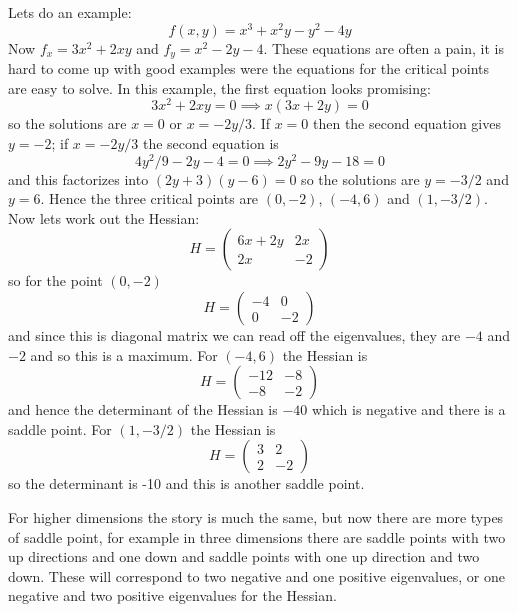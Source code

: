 \documentclass[12pt]{article}
\begin{document}
Lets do an example:
\begin{equation}
  f(x,y)=x^3+x^2y-y^2-4y
\end{equation}
Now $f_x=3x^2+2xy$ and $f_y=x^2-2y-4$. These equations are often a
pain, it is hard to come up with good examples were the equations for
the critical points are easy to solve. In this example, the first equation looks promising:
\begin{equation}
  3x^2+2xy=0\implies{}x(3x+2y)=0
\end{equation}
so the solutions are $x=0$ or $x=-2y/3$. If $x=0$ then the second
equation gives $y=-2$; if $x=-2y/3$ the second equation is
\begin{equation}
  4y^2/9-2y-4=0\implies{}2y^2-9y-18=0
\end{equation}
and this factorizes into $(2y+3)(y-6)=0$ so the solutions are $y=-3/2$
and $y=6$. Hence the three critical points are $(0,-2)$, $(-4,6)$ and $(1,-3/2)$. Now lets work out the Hessian:
\begin{equation}
  H=\left(\begin{array}{cc}6x+2y&2x\\2x&-2\end{array}\right)
\end{equation}
so for the point $(0,-2)$
\begin{equation}
  H=\left(\begin{array}{cc}-4&0\\0&-2\end{array}\right)
\end{equation}
and since this is diagonal matrix we can read off the eigenvalues,
they are $-4$ and $-2$ and so this is a maximum. For $(-4,6)$ the Hessian is
\begin{equation}
  H=\left(\begin{array}{cc}-12&-8\\-8&-2\end{array}\right)
\end{equation}
and hence the determinant of the Hessian is $-40$ which is negative and there is a saddle point. For $(1,-3/2)$ the Hessian is
\begin{equation}
  H=\left(\begin{array}{cc}3&2\\2&-2\end{array}\right)
\end{equation}
so the determinant is -10 and this is another saddle point.

For higher dimensions the story is much the same, but now there are
more types of saddle point, for example in three dimensions there are
saddle points with two up directions and one down and saddle points
with one up direction and two down. These will correspond to two
negative and one positive eigenvalues, or one negative and two
positive eigenvalues for the Hessian.
\end{document}
